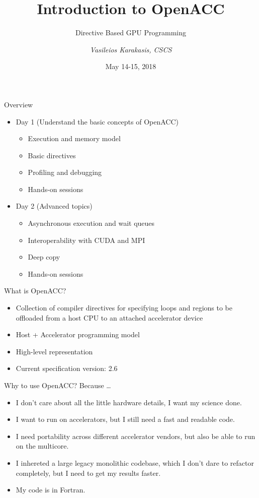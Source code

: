 \documentclass[12pt,aspectratio=169]{beamer}
\author{\emph{Vasileios Karakasis, CSCS}}
\title{Introduction to OpenACC}
\subtitle{Directive Based GPU Programming}
\date{May 14-15, 2018}
\begin{document}
\cscstitle

\begin{frame}{Overview}
  \begin{itemize}
  \item Day 1 (Understand the basic concepts of OpenACC)
    \begin{itemize}
    \item Execution and memory model
    \item Basic directives
    \item Profiling and debugging
    \item Hands-on sessions
    \end{itemize}
    \vspace\baselineskip
  \item Day 2 (Advanced topics)
    \begin{itemize}
    \item Asynchronous execution and wait queues
    \item Interoperability with CUDA and MPI
    \item Deep copy
    \item Hands-on sessions
    \end{itemize}
  \end{itemize}
\end{frame}

\begin{frame}{What is OpenACC?}
  \begin{itemize}
  \item Collection of compiler directives for specifying loops and regions to be
    offloaded from a host CPU to an attached accelerator device
  \item Host + Accelerator programming model
  \item High-level representation
  \item Current specification version: 2.6
  \end{itemize}
\end{frame}

\begin{frame}{Why to use OpenACC?}
  Because \dots
  \vspace\baselineskip
  \begin{itemize}
  \item I don't care about all the little hardware details, I want my science done.
  \item I want to run on accelerators, but I still need a fast and readable code.
  \item I need portability across different accelerator vendors, but also be able to run on the multicore.
  \item I inhereted a large legacy monolithic codebase, which I don't dare to
    refactor completely, but I need to get my results faster.
  \item My code is in Fortran.
  \end{itemize}
\end{frame}
\end{document}
